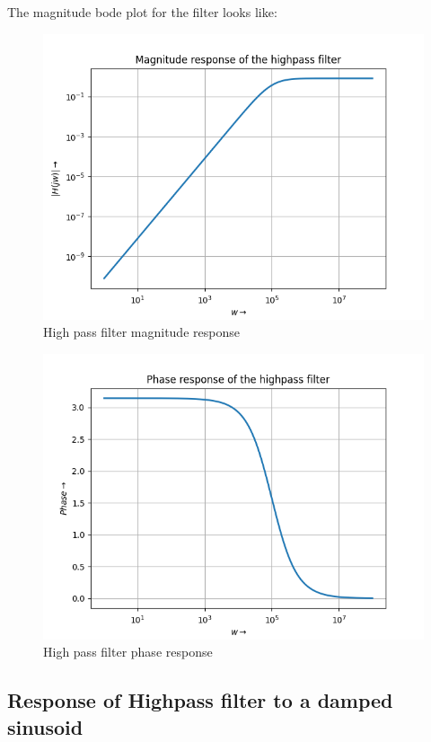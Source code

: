 \documentclass{article}
\begin{document}
The magnitude bode plot for the filter looks like:
\begin{figure}[h!]
\centering
\includegraphics[scale=0.45]{Figure_5.png}
\caption{High pass filter magnitude response}
\label{fig:High pass filter magnitude response}
\end{figure}
\begin{figure}[h!]
	\centering
	\includegraphics[scale=0.45]{Figure_6.png}
	\caption{High pass filter phase response}
	\label{fig:High pass filter phase response}
\end{figure}



\clearpage


\subsection{Response of Highpass filter to a damped sinusoid}
\end{document}
